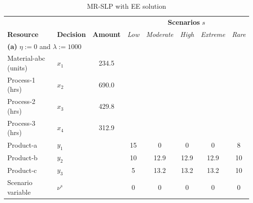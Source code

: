 \documentclass[7pt]{article}
\begin{document}
\begin{table}[h!]
    \centering
    \footnotesize
    \caption{\small{MR-SLP with EE solution}}
    \begin{tabular}{ll|c|ccccc}
        \toprule
        \multicolumn{3}{l|}{} & \multicolumn{5}{c}{\textbf{Scenarios }$s$}                                                                                                         \\
        \textbf{Resource}     & \textbf{Decision}                          & \textbf{Amount} & \textit{Low} & \textit{Moderate} & \textit{High} & \textit{Extreme} & \textit{Rare} \\
        \midrule
        \multicolumn{8}{l}{\textbf{(a)} $\eta := 0$ and $\lambda := 1000$}                                                                                                         \\
        \midrule
        Material-abc (units)  & $x_1$                                      & 234.5           &              &                   &               &                                  \\
        Process-1 (hrs)       & $x_2$                                      & 690.0           &              &                   &               &                                  \\
        Process-2 (hrs)       & $x_3$                                      & 429.8           &              &                   &               &                                  \\
        Process-3 (hrs)       & $x_4$                                      & 312.9           &              &                   &               &                                  \\
        Product-a             & $y_1$                                      &                 & 15           & 0                 & 0             & 0                & 8             \\
        Product-b             & $y_2$                                      &                 & 10           & 12.9              & 12.9          & 12.9             & 10            \\
        Product-c             & $y_3$                                      &                 & 5            & 13.2              & 13.2          & 13.2             & 10            \\
        Scenario variable     & $\nu^s$                                    &                 & 0            & 0                 & 0             & 0                & 0             \\

\end{tabular}
\end{table}
\end{document}
